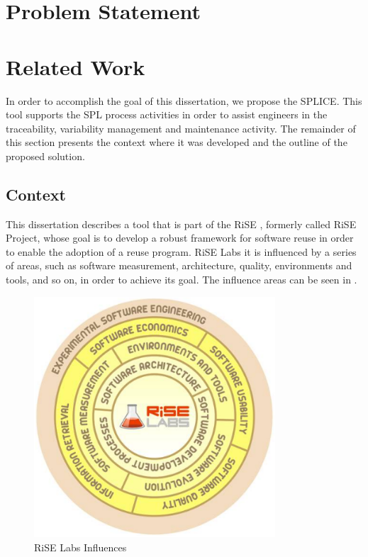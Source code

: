 \section{Problem Statement}
\label{sc:problem}


\section{Related Work}
\label{sc:related}
In order to accomplish the goal of this dissertation, we propose the \acf{SPLICE}.
This tool supports the \acf{SPL} process activities in order to assist engineers in the traceability, variability management and maintenance activity.
The remainder of this section presents the context where it was developed and the outline of the proposed solution.

\subsection{Context}
This dissertation describes a tool that is part of the \ac{RiSE} \citep{Almeida2004}, formerly
called RiSE Project, whose goal is to develop a robust framework for software
reuse in order to enable the adoption of a reuse program. RiSE Labs it is
influenced by a series of areas, such as software measurement, architecture,
quality, environments and tools, and so on, in order to achieve its goal. The
influence areas can be seen in .

\begin{figure}[htp]
\begin{center}
  \includegraphics[width=9cm]{chapters/introduction/rise-spiral.png}
  \caption[RiSE Labs Influences]{RiSE Labs Influences}
  \label{fg:rise-spiral}
\end{center}
\end{figure}

